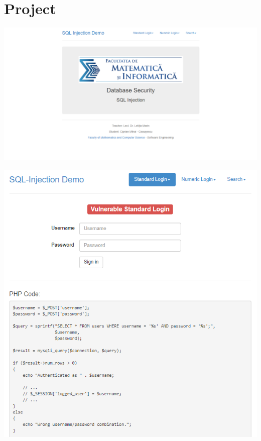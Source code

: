 \documentclass{article}
\begin{document}
\section*{Project}
\begin{center}
\includegraphics[scale=0.5]{f1}
\end{center}
\begin{center}
\includegraphics[scale=1]{f2}
\end{center}
\end{document}
